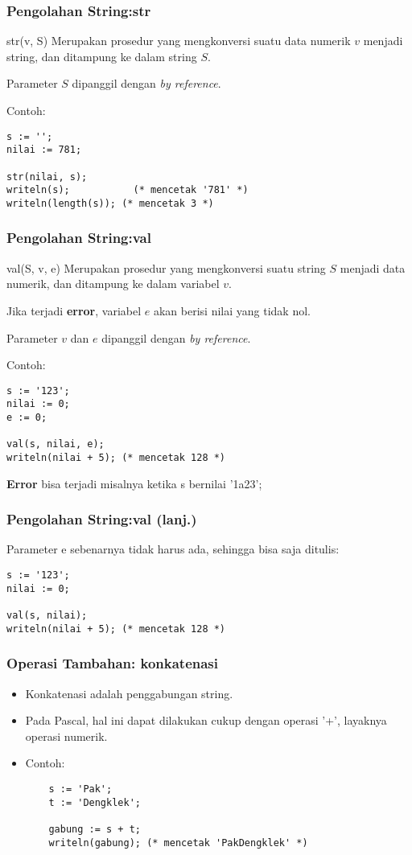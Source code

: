 \documentclass{beamer}
\begin{document}
\begin{frame}[fragile]
\frametitle{Pengolahan String:\newline str}
\begin{block}{str(v, S)}
Merupakan prosedur yang mengkonversi suatu data numerik $v$ menjadi string, dan ditampung ke dalam string $S$.

Parameter $S$ dipanggil dengan \textit{by reference}.
\end{block}
Contoh:
\begin{lstlisting}
s := '';
nilai := 781;

str(nilai, s);
writeln(s);           (* mencetak '781' *)
writeln(length(s)); (* mencetak 3 *)
\end{lstlisting}
\end{frame}

\begin{frame}[fragile]
\frametitle{Pengolahan String:\newline val}
\begin{block}{val(S, v, e)}
Merupakan prosedur yang mengkonversi suatu string $S$ menjadi data numerik, dan ditampung ke dalam variabel $v$.

Jika terjadi \textbf{error}, variabel $e$ akan berisi nilai yang tidak nol.

Parameter $v$ dan $e$ dipanggil dengan \textit{by reference}.
\end{block}
Contoh:
\begin{lstlisting}
s := '123';
nilai := 0;
e := 0;

val(s, nilai, e);
writeln(nilai + 5); (* mencetak 128 *)
\end{lstlisting}

\textbf{Error} bisa terjadi misalnya ketika s bernilai '1a23';
\end{frame}

\begin{frame}[fragile]
\frametitle{Pengolahan String:\newline val (lanj.)}
Parameter e sebenarnya tidak harus ada, sehingga bisa saja ditulis:
\begin{lstlisting}
s := '123';
nilai := 0;

val(s, nilai);
writeln(nilai + 5); (* mencetak 128 *)
\end{lstlisting}
\end{frame}

\begin{frame}[fragile]
\frametitle{Operasi Tambahan: konkatenasi}
\begin{itemize}
	\item Konkatenasi adalah penggabungan string.
	\item Pada Pascal, hal ini dapat dilakukan cukup dengan operasi '+', layaknya operasi numerik.
	\item Contoh:
	\begin{lstlisting}
	s := 'Pak';
	t := 'Dengklek';
	
	gabung := s + t;
	writeln(gabung); (* mencetak 'PakDengklek' *)
	\end{lstlisting}
\end{itemize}
\end{frame}
\end{document}
